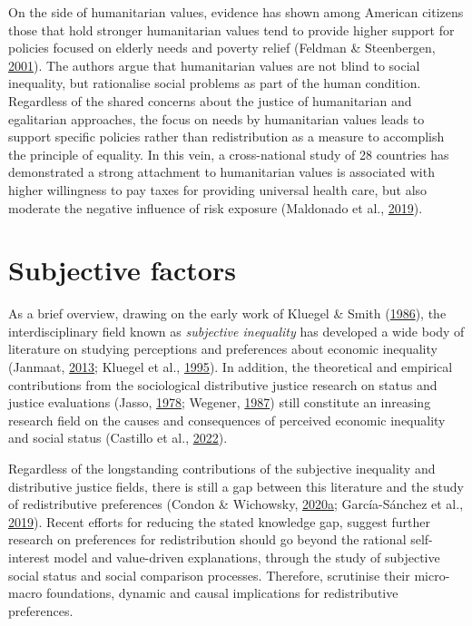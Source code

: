 \documentclass[
  12pt,
]{book}
\begin{document}
On the side of humanitarian values, evidence has shown among American citizens those that hold stronger humanitarian values tend to provide higher support for policies focused on elderly needs and poverty relief (Feldman \& Steenbergen, \protect\hyperlink{ref-feldman_humanitarian_2001}{2001}). The authors argue that humanitarian values are not blind to social inequality, but rationalise social problems as part of the human condition. Regardless of the shared concerns about the justice of humanitarian and egalitarian approaches, the focus on needs by humanitarian values leads to support specific policies rather than redistribution as a measure to accomplish the principle of equality. In this vein, a cross-national study of 28 countries has demonstrated a strong attachment to humanitarian values is associated with higher willingness to pay taxes for providing universal health care, but also moderate the negative influence of risk exposure (Maldonado et al., \protect\hyperlink{ref-Maldonadoetal2019}{2019}).

\hypertarget{subjective-factors}{%
\chapter{Subjective factors}\label{subjective-factors}}

As a brief overview, drawing on the early work of Kluegel \& Smith (\protect\hyperlink{ref-Kluegel-Smith1986}{1986}), the interdisciplinary field known as \emph{subjective inequality} has developed a wide body of literature on studying perceptions and preferences about economic inequality (Janmaat, \protect\hyperlink{ref-Janmaat2013}{2013}; Kluegel et al., \protect\hyperlink{ref-KluegelSmithWegener1995}{1995}). In addition, the theoretical and empirical contributions from the sociological distributive justice research on status and justice evaluations (Jasso, \protect\hyperlink{ref-jasso_justice_1978}{1978}; Wegener, \protect\hyperlink{ref-wegener_illusion_1987}{1987}) still constitute an inreasing research field on the causes and consequences of perceived economic inequality and social status (Castillo et al., \protect\hyperlink{ref-castillo_perception_2022}{2022}).

Regardless of the longstanding contributions of the subjective inequality and distributive justice fields, there is still a gap between this literature and the study of redistributive preferences (Condon \& Wichowsky, \protect\hyperlink{ref-condon_economic_2020}{2020}\protect\hyperlink{ref-condon_economic_2020}{a}; García-Sánchez et al., \protect\hyperlink{ref-Garcia-Sanchez19}{2019}). Recent efforts for reducing the stated knowledge gap, suggest further research on preferences for redistribution should go beyond the rational self-interest model and value-driven explanations, through the study of subjective social status and social comparison processes. Therefore, scrutinise their micro-macro foundations, dynamic and causal implications for redistributive preferences.
\end{document}
